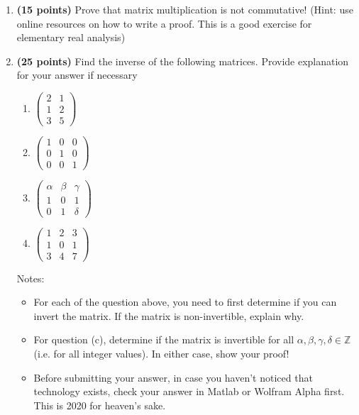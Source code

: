 \documentclass[letter,11pt]{article}
\begin{document}
\begin{enumerate}

\item \textbf{(15 points)} Prove that matrix multiplication is not commutative! (Hint: use online resources on how to write a proof. This is a good exercise for elementary real analysis)
\item \textbf{(25 points)} Find the inverse of the following matrices. Provide explanation for your answer if necessary 
\begin{multicols}{4}
\begin{enumerate}

\item $\begin{pmatrix}
2 & 1 
\\
1 & 2 
\\ 
3 & 5
\end{pmatrix}$ \\

\item $\begin{pmatrix}
1 & 0 & 0
\\
0 & 1 & 0
\\ 
0 & 0 & 1
\end{pmatrix}$ \\

\item $\begin{pmatrix}
\alpha & \beta & \gamma
\\
1 & 0 & 1
\\ 
0 & 1 & \delta
\end{pmatrix}$ \\

\item $\begin{pmatrix}
1 & 2 & 3
\\
1 & 0 & 1
\\ 
3 & 4 & 7
\end{pmatrix}$
\end{enumerate}
\end{multicols} 

Notes: 
\begin{itemize}
\item For each of the question above, you need to first determine if you can invert the matrix. If the matrix is non-invertible, explain why.
\item For question (c), determine if the matrix is invertible for all $\alpha, \beta, \gamma, \delta \in \mathbb{Z}$ (i.e. for all integer values). In either case, show your proof!
\item Before submitting your answer, in case you haven't noticed that technology exists, check your answer in Matlab or Wolfram Alpha first. This is 2020 for heaven's sake.
\end{itemize}



\end{enumerate}
\end{document}

